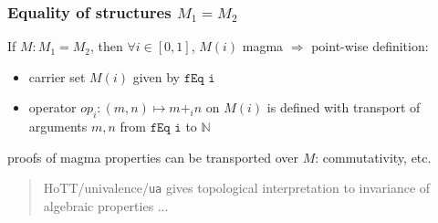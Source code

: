 \documentclass[english,handout]{beamer}
\begin{document}
\begin{frame}[fragile]
\frametitle{Equality of structures $M_1=M_2$}

If $M : M_1 = M_2$, then $\forall i \in [0, 1]$, $M (i)$ magma $\Rightarrow$ point-wise definition:

\begin{itemize}
 \item carrier set $M(i)$ given by $\texttt{fEq i}$
 \item operator $op_i: (m,n) \mapsto m +_i n$ on $M(i)$ is defined with transport of arguments $m,n$ from $\texttt{fEq i}$ to $\mathbb{N}$
\end{itemize}


proofs of magma properties can be transported over $M$: commutativity, etc.




\begin{quotation}
HoTT/univalence/\texttt{ua} gives topological interpretation to invariance of algebraic properties ...
\end{quotation}


\end{frame}
\end{document}
